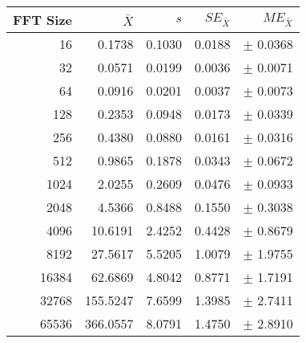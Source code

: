 \begin{tabular}{|r|r|r|r|r|}\hline
    FFT Size & $\bar{X}$ & $s$ & $SE_{\bar{X}}$ & $ME_{\bar{X}}$ \\ \hline
    16 & 0.1738 & 0.1030 & 0.0188 & $\pm$ 0.0368 \\ \hline
    32 & 0.0571 & 0.0199 & 0.0036 & $\pm$ 0.0071 \\ \hline
    64 & 0.0916 & 0.0201 & 0.0037 & $\pm$ 0.0073 \\ \hline
    128 & 0.2353 & 0.0948 & 0.0173 & $\pm$ 0.0339 \\ \hline
    256 & 0.4380 & 0.0880 & 0.0161 & $\pm$ 0.0316 \\ \hline
    512 & 0.9865 & 0.1878 & 0.0343 & $\pm$ 0.0672 \\ \hline
    1024 & 2.0255 & 0.2609 & 0.0476 & $\pm$ 0.0933 \\ \hline
    2048 & 4.5366 & 0.8488 & 0.1550 & $\pm$ 0.3038 \\ \hline
    4096 & 10.6191 & 2.4252 & 0.4428 & $\pm$ 0.8679 \\ \hline
    8192 & 27.5617 & 5.5205 & 1.0079 & $\pm$ 1.9755 \\ \hline
    16384 & 62.6869 & 4.8042 & 0.8771 & $\pm$ 1.7191 \\ \hline
    32768 & 155.5247 & 7.6599 & 1.3985 & $\pm$ 2.7411 \\ \hline
    65536 & 366.0557 & 8.0791 & 1.4750 & $\pm$ 2.8910 \\ \hline
\end{tabular}
